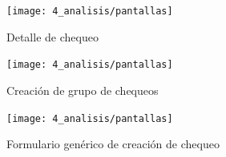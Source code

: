 \begin{figure}[htbp]
  \centering
  \texttt{[image: 4\_analisis/pantallas]}
  \caption{Detalle de chequeo}
\end{figure}

\begin{figure}[htbp]
  \centering
  \texttt{[image: 4\_analisis/pantallas]}
  \caption{Creación de grupo de chequeos}
\end{figure}


\begin{figure}[htbp]
  \centering
  \texttt{[image: 4\_analisis/pantallas]}
  \caption{Formulario genérico de creación de chequeo}
\end{figure}





